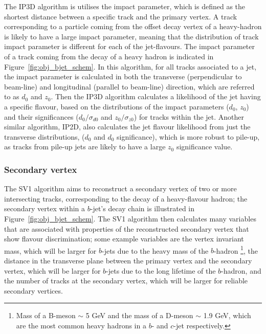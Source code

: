    The IP3D algorithm is utilises the impact parameter, which is defined as the shortest distance between a specific track and the primary vertex.
   A track corresponding to a particle coming from the offset decay vertex of a heavy-hadron is likely to have a large impact parameter,
   meaning that the distribution of track impact parameter is different for each of the jet-flavours.
   The impact parameter of a track coming from the decay of a heavy hadron is indicated in Figure~\ref{fig:obj_bjet_schem}.
   In this algorithm, for all tracks associated to a jet, the impact parameter is calculated in both the transverse (perpendicular to beam-line)
   and longitudinal (parallel to beam-line) direction, which are referred to as $d_{0}$ and $z_{0}$.
   Then the IP3D algorithm calculates a likelihood of the jet having a specific flavour, 
   based on the distributions of the impact parameters ($d_{0}$, $z_{0}$) and their significances 
   ($d_{0}/\sigma _{d0}$ and  $z_{0}/\sigma_{z0}$) for tracks within the jet. 
   Another similar algorithm, IP2D, also calculates the jet flavour likelihood from just the transverse distributions, ($d_{0}$ and $d_{0}$ significance), which is more
   robust to pile-up, as tracks from pile-up jets are likely to have a large $z_{0}$ significance value.
   
   \subsubsection{Secondary vertex}
   \label{sec:obj-bjets_SV}

   
   The SV1 algorithm aims to reconstruct a secondary vertex of two or more intersecting tracks, corresponding to the decay of a heavy-flavour hadron;
   the secondary vertex within a $b$-jet's decay chain is illustrated in Figure~\ref{fig:obj_bjet_schem}.
   The SV1 algorithm then calculates many variables that are associated with properties of the reconstructed secondary vertex that show flavour discrimination;
   some example variables are the vertex invariant mass,
   which will be larger for $b$-jets due to the heavy mass of the $b$-hadron
   \footnote{Mass of a B-meson $\sim$ 5 GeV and the mass of a D-meson $\sim$ 1.9 GeV, which are the most common heavy hadrons in a $b$- and $c$-jet respectively.}, 
   the distance in the transverse plane between the primary vertex and the secondary vertex, %
   which will be larger for $b$-jets due to the long lifetime of the $b$-hadron,
   and the number of tracks at the secondary vertex, which will be larger for reliable secondary vertices.
   
